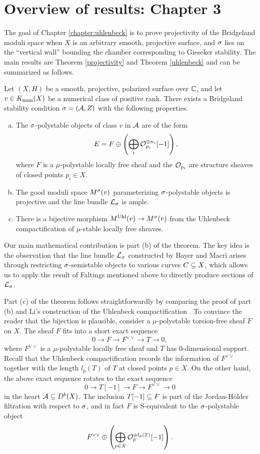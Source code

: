 \section{Overview of results: Chapter 3}
The goal of Chapter \ref{chapter:uhlenbeck} is to prove projectivity of the Bridgeland moduli space when $X$ is an arbitrary smooth, projective surface, and $\sigma$ lies on the ``vertical wall'' bounding the chamber corresponding to Gieseker stability. The main results are Theorem \ref{projectivity} and Theorem \ref{uhlenbeck} and can be summarized as follows.
\begin{thm}
    Let $(X,H)$ be a smooth, projective, polarized surface over $\mathbb{C}$, and let $v \in K_{\mathrm{num}}(X)$ be a numerical class of positive rank. There exists a Bridgeland stability condition $\sigma = (\mathcal{A}, Z)$ with the following properties.
    \begin{enumerate}[(a)]
        \item The $\sigma$-polystable objects of class $v$ in $\mathcal{A}$ are of the form
        \[ E = F \oplus \left(\bigoplus_i \mathcal{O}_{p_i}^{\oplus n_i} [-1]\right), \]
        where $F$ is a $\mu$-polystable locally free sheaf and the $\mathcal{O}_{p_i}$ are structure sheaves of closed points $p_i \in X$.
        \item The good moduli space $M^\sigma(v)$ parameterizing $\sigma$-polystable objects is projective and the line bundle $\mathcal{L}_\sigma$ is ample.
        \item There is a bijective morphism $M^{\mathrm{Uhl}}(v) \to M^\sigma(v)$ from the Uhlenbeck compactification of $\mu$-stable locally free sheaves.
    \end{enumerate}
\end{thm}
Our main mathematical contribution is part (b) of the theorem. The key idea is the observation that the line bundle $\mathcal{L}_\sigma$ constructed by Bayer and Macr\`i arises through restricting $\sigma$-semistable objects to various curves $C \subseteq X$, which allows us to apply the result of Faltings mentioned above to directly produce sections of $\mathcal{L}_\sigma$.

Part (c) of the theorem follows straightforwardly by comparing the proof of part (b) and Li's construction of the Uhlenbeck compactification \cite{li}. To convince the reader that the bijection is plausible, consider a $\mu$-polystable torsion-free sheaf $F$ on $X$. The sheaf $F$ fits into a short exact sequence
\[ 0 \to F \to F^{\vee\vee} \to T \to 0, \]
where $F^{\vee\vee}$ is a $\mu$-polystable locally free sheaf and $T$ has 0-dimensional support. Recall that the Uhlenbeck compactification records the information of $F^{\vee\vee}$ together with the length $l_p(T)$ of $T$ at closed points $p \in X$. On the other hand, the above exact sequence rotates to the exact sequence
\[ 0 \to T[-1] \to F \to F^{\vee\vee} \to 0 \]
in the heart $\mathcal{A} \subseteq D^b(X)$. The inclusion $T[-1] \subseteq F$ is part of the Jordan-H\"older filtration with respect to $\sigma$, and in fact $F$ is S-equivalent to the $\sigma$-polystable object
\[ F^{\vee\vee} \oplus \left(\bigoplus_{p \in X} \mathcal{O}_p^{\oplus l_p(T)}[-1]\right). \]

